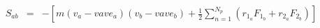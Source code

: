 \documentclass[12pt]{article}
\begin{document}
\begin{eqnarray*}
S_{ab} & = & - \left[ m (v_a - vave_a) (v_b-vave_b) + 
   \frac{1}{2} \sum_{n = 1}^{N_p} (r_{1_a} F_{1_b} + r_{2_a} F_{2_b}) 
    \right]
\end{eqnarray*}
\end{document}
